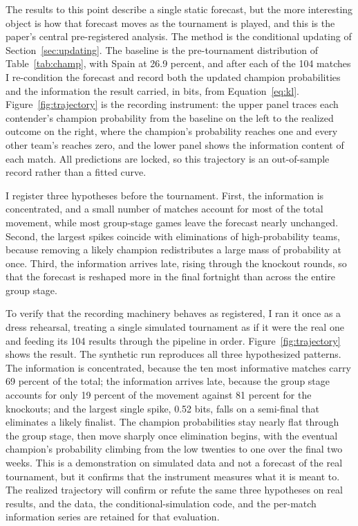 \documentclass[11pt,letterpaper]{article}
\begin{document}
The results to this point describe a single static forecast, but the more interesting object is how that forecast moves as the tournament is played, and this is the paper's central pre-registered analysis. The method is the conditional updating of Section~\ref{sec:updating}. The baseline is the pre-tournament distribution of Table~\ref{tab:champ}, with Spain at 26.9 percent, and after each of the 104 matches I re-condition the forecast and record both the updated champion probabilities and the information the result carried, in bits, from Equation~\eqref{eq:kl}. Figure~\ref{fig:trajectory} is the recording instrument: the upper panel traces each contender's champion probability from the baseline on the left to the realized outcome on the right, where the champion's probability reaches one and every other team's reaches zero, and the lower panel shows the information content of each match. All predictions are locked, so this trajectory is an out-of-sample record rather than a fitted curve.

I register three hypotheses before the tournament. First, the information is concentrated, and a small number of matches account for most of the total movement, while most group-stage games leave the forecast nearly unchanged. Second, the largest spikes coincide with eliminations of high-probability teams, because removing a likely champion redistributes a large mass of probability at once. Third, the information arrives late, rising through the knockout rounds, so that the forecast is reshaped more in the final fortnight than across the entire group stage.

To verify that the recording machinery behaves as registered, I ran it once as a dress rehearsal, treating a single simulated tournament as if it were the real one and feeding its 104 results through the pipeline in order. Figure~\ref{fig:trajectory} shows the result. The synthetic run reproduces all three hypothesized patterns. The information is concentrated, because the ten most informative matches carry 69 percent of the total; the information arrives late, because the group stage accounts for only 19 percent of the movement against 81 percent for the knockouts; and the largest single spike, 0.52 bits, falls on a semi-final that eliminates a likely finalist. The champion probabilities stay nearly flat through the group stage, then move sharply once elimination begins, with the eventual champion's probability climbing from the low twenties to one over the final two weeks. This is a demonstration on simulated data and not a forecast of the real tournament, but it confirms that the instrument measures what it is meant to. The realized trajectory will confirm or refute the same three hypotheses on real results, and the data, the conditional-simulation code, and the per-match information series are retained for that evaluation.
\end{document}
